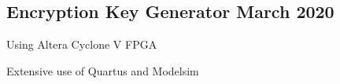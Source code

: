 \documentclass[letter,10pt]{article}
\begin{document}
\subsection{{Encryption Key Generator \hfill March 2020}}
\begin{zitemize}
	\item Using Altera Cyclone V FPGA
	\item Extensive use of Quartus and Modelsim
\end{zitemize}


\end{document}
